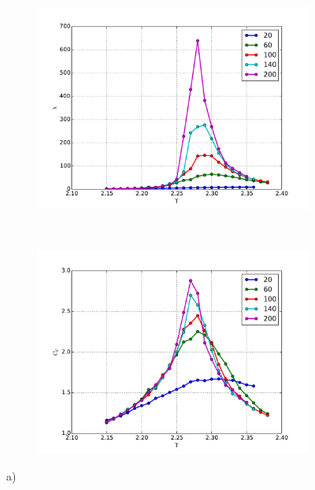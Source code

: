 \begin{figure}[H]
    \centering
    \begin{subfigure}{0.5\textwidth}
        \centering
        \includegraphics[width=\linewidth]{result/bilder/Tc/chi-Tc}
        \caption{}
    \end{subfigure}%
    ~ 
    \begin{subfigure}{0.5\textwidth}
        \centering
        \includegraphics[width=\linewidth]{result/bilder/Tc/cv-Tc}
        \caption{}
    \end{subfigure}
    \caption{a) }
    \label{fig:tc-chi-cv}
\end{figure}

